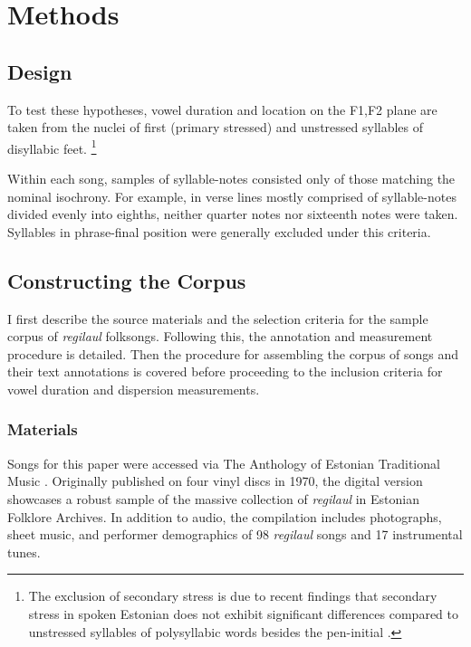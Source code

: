 \chapter{Methods}
%

\section{Design}
To test these hypotheses, vowel duration and location on the F1,F2 plane are taken from the nuclei of first (primary stressed) and unstressed syllables of disyllabic feet. \footnote{The exclusion of secondary stress is due to recent findings that secondary stress in spoken Estonian does not exhibit significant differences compared to unstressed syllables of polysyllabic words besides the pen-initial \cite{asuLippus2018}. }

Within each song, samples of syllable-notes consisted only of those matching the nominal isochrony. For example, in verse lines mostly comprised of syllable-notes divided evenly into eighths, neither quarter notes nor sixteenth notes were taken. Syllables in phrase-final position were generally excluded under this criteria. 



\section{Constructing the Corpus}

I first describe the source materials and the selection criteria for the sample corpus of {\it regilaul} folksongs. Following this, the annotation and measurement procedure is detailed. Then the procedure for assembling the corpus of songs and their text annotations is covered before proceeding to the inclusion criteria for vowel duration and dispersion measurements.

\subsection{Materials}

Songs for this paper were accessed via The Anthology of Estonian Traditional Music \citep{tampere2016}. Originally published on four vinyl discs in 1970, the digital version showcases a robust sample of the massive collection of {\it regilaul} in Estonian Folklore Archives. In addition to audio, the  compilation includes  photographs, sheet music, and performer demographics of 98 {\it regilaul} songs and 17 instrumental tunes. 

